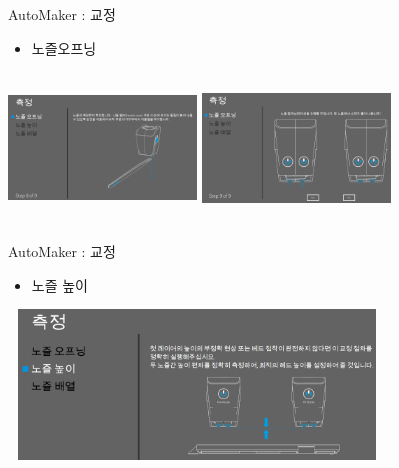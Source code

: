 \documentclass[11pt]{beamer}
\begin{document}
\begin{frame}[t]{AutoMaker : 교정 }\footnotesize
\begin{itemize}
\item 노즐오프닝
\end{itemize}
\includegraphics[width=5cm, height=4cm]{./image/17_40.png} \@ \includegraphics[width=5cm, height=4cm]{./image/17_41.png}
\end{frame}

\begin{frame}[t]{AutoMaker : 교정 }\footnotesize
\begin{itemize}
\item 노즐 높이
\end{itemize}
\includegraphics[width=10cm, height=4cm]{./image/17_31.png} 
\end{frame}
\end{document}
